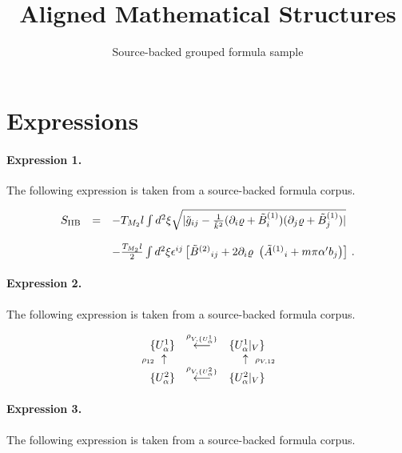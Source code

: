\documentclass[11pt]{article}
\title{Aligned Mathematical Structures}
\author{Source-backed grouped formula sample}
\date{}
\begin{document}
\maketitle
\section{Expressions}
\paragraph{Expression 1.} The following expression is taken from a source-backed formula corpus.

\begin{align*}\begin{array}{rcl}S_{{\rm IIB}} & = & -T_{M_2}l\int d^2\xi\sqrt{|{\tilde g}_{ij}-\frac{1}{{\tilde k}^2}(\partial_i \varrho+{\tilde B}^{(1)}_i)(\partial_j \varrho+{\tilde B}^{(1)}_j)|}\\& & \\& &-\frac{T_{M_2}l}{2}\int d^2\xi\epsilon^{ij}\left[\tilde{B}^{(2)}{}_{ij}+2\partial_{i}\varrho\ \left({\tilde A}^{(1)}{}_{i}+m\pi\alpha^{\prime} b_{j}\right)\right]\, .\\\end{array}\end{align*}

\paragraph{Expression 2.} The following expression is taken from a source-backed formula corpus.

\begin{align*}\begin{array}{ccc}\{ U^1_{\alpha} \} & \stackrel{ \rho_{V, \{ U^1_{\alpha} \}} }{ \longleftarrow } & \{ U^1_{\alpha} |_V \} \\\makebox[0pt][r]{ $\scriptstyle{ \rho_{12} }$ } \uparrow & &\uparrow \makebox[0pt][l]{ $\scriptstyle{ \rho_{V, 12} }$ } \\\{ U^2_{\alpha} \} & \stackrel{ \rho_{V, \{ U^2_{\alpha} \} } }{ \longleftarrow } & \{ U^2_{\alpha} |_V \}\end{array}\end{align*}

\paragraph{Expression 3.} The following expression is taken from a source-backed formula corpus.
\end{document}
